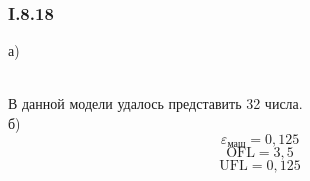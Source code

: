 \subsubsection*{I.8.18}
а)
\begin{figure}[h]
\end{figure}\\
В данной модели удалось представить 32 числа.\\
б) 
$$\varepsilon_{маш} = 0,125$$
$$\text{OFL} = 3,5$$
$$\text{UFL} = 0,125$$